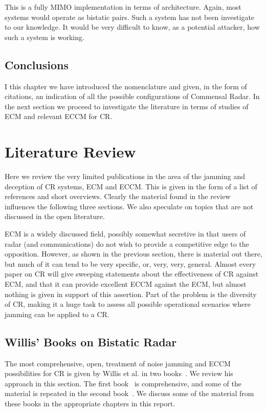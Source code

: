 \documentclass[english, 12pt]{report}
\begin{document}
This is a fully MIMO implementation in terms of architecture. Again, most systems would operate as bistatic pairs. Such a system has not been investigate to our knowledge. It would be very difficult to know, as a potential attacker, how such a system is working.


\section{Conclusions}

I this chapter we have introduced the nomenclature and given, in the form of citations, an indication of all the possible configurations of Commensal Radar. In the next section we proceed to investigate the literature in terms of studies of ECM and relevant ECCM for CR.



\chapter{Literature Review}

Here we review the very limited publications in the area of the jamming and deception of CR systems, ECM and ECCM. This is given in the form of a list of references and short overviews. Clearly the material found in the review influences the following three sections. We also speculate on topics that are not discussed in the open literature. 

ECM is a widely discussed field, possibly somewhat secretive in that users of radar (and communications) do not wish to provide a competitive edge to the opposition. However, as shown in the previous section, there is material out there, but much of it can tend to be very specific, or, very, very, general. Almost every paper on CR will give sweeping statements about the effectiveness of CR against ECM, and that it can provide excellent ECCM against the ECM, but almost nothing is given in support of this assertion. Part of the problem is the diversity of CR, making it a huge task to assess all possible operational scenarios where jamming can be applied to a CR.


\section{Willis' Books on Bistatic Radar}

The most comprehensive, open,  treatment of noise jamming and ECCM possibilities for CR is given by Willis et al. in two books~\cite{willis:05,willis:07}. We review his approach in this section. The first book~\cite{willis:05} is comprehensive, and some of the material is repeated in the second book~\cite{willis:07}. We discuss some of the material from these books in the appropriate chapters in this report.
\end{document}
